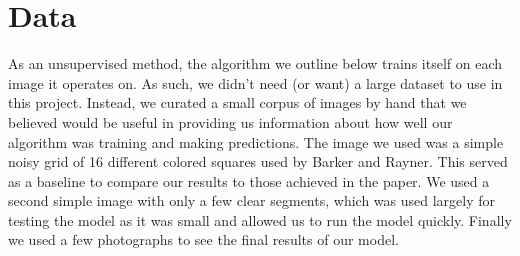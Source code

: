 \documentclass[11pt]{article}
\begin{document}
\section{Data}
As an unsupervised method, the algorithm we outline below trains itself on each image it operates on. As such, we didn't need (or want) a large dataset to use in this project.
Instead, we curated a small corpus of images by hand that we believed would be useful in providing us information about how well our algorithm was training and making predictions. 
The image we used was a simple noisy grid of 16 different colored squares used by Barker and Rayner.
This served as a baseline to compare our results to those achieved in the paper.
We used a second simple image with only a few clear segments, which was used largely for testing the model as it was small and allowed us to run the model quickly.
Finally we used a few photographs to see the final results of our model.
\end{document}
